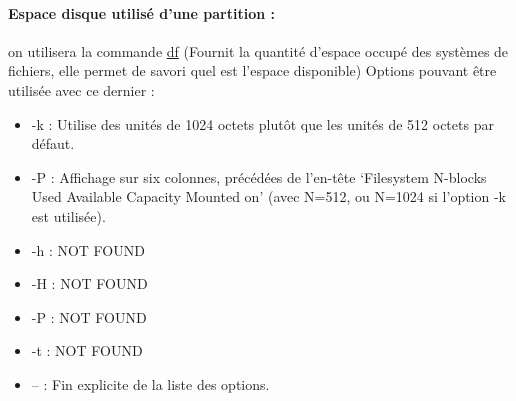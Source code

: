 \documentclass{article}[12pt]
\begin{document}
\paragraph{Espace disque utilisé d'une partition : } on utilisera la commande \href{http://jp.barralis.com/linux-man/man1/df.1.php}{df} (Fournit la quantité d'espace occupé des systèmes de fichiers, elle permet de savori quel est l'espace disponible) Options pouvant être utilisée avec ce dernier :
\begin{itemize}
\item -k : Utilise des unités de 1024 octets plutôt que les unités de 512 octets par défaut.
\item -P : Affichage sur six colonnes, précédées de l'en-tête `Filesystem N-blocks Used Available Capacity Mounted on' (avec N=512, ou N=1024 si l'option -k est utilisée).
\item -h : NOT FOUND
\item -H : NOT FOUND
\item -P : NOT FOUND
\item -t : NOT FOUND
\item -- : Fin explicite de la liste des options.
\end{itemize}
\end{document}
